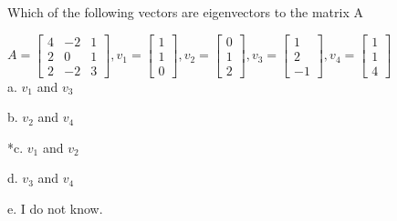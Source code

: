  
Which of the following vectors are eigenvectors to the matrix A

$
A = \begin{bmatrix}
4 & -2 & 1 \\
2 & 0 & 1 \\
2 & -2 & 3
\end{bmatrix}, 
v_1 = \begin{bmatrix}
1 \\
1 \\
0
\end{bmatrix}, 
v_2 = \begin{bmatrix}
0 \\
1 \\
2
\end{bmatrix}, 
v_3 = \begin{bmatrix}
1 \\
2 \\
-1
\end{bmatrix}, 
v_4 = \begin{bmatrix}
1 \\
1 \\
4
\end{bmatrix}
$
\\
a. $v_1$ and $v_3$

b. $v_2$   and $v_4$

*c. $v_1$ and $v_2$

d. $v_3$ and $v_4$

e.  I do not know.\\
